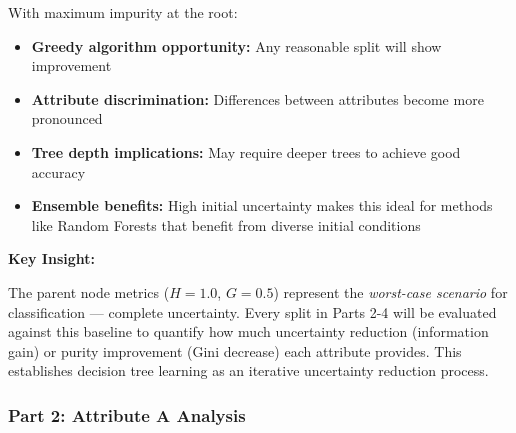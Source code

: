 \documentclass[12pt]{article}
\begin{document}
\begin{explanation}
With maximum impurity at the root:
\begin{itemize}
    \item \textbf{Greedy algorithm opportunity:} Any reasonable split will show improvement
    \item \textbf{Attribute discrimination:} Differences between attributes become more pronounced
    \item \textbf{Tree depth implications:} May require deeper trees to achieve good accuracy
    \item \textbf{Ensemble benefits:} High initial uncertainty makes this ideal for methods like Random Forests that benefit from diverse initial conditions
\end{itemize}

\textbf{Key Insight:}

The parent node metrics ($H = 1.0$, $G = 0.5$) represent the \textit{worst-case scenario} for classification — complete uncertainty. Every split in Parts 2-4 will be evaluated against this baseline to quantify how much uncertainty reduction (information gain) or purity improvement (Gini decrease) each attribute provides. This establishes decision tree learning as an iterative uncertainty reduction process.
\end{explanation}

\subsubsection{Part 2: Attribute A Analysis}
\end{document}
